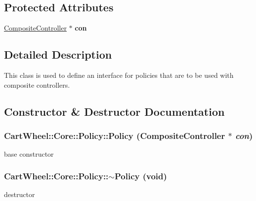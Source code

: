 \subsection*{Protected Attributes}
\begin{DoxyCompactItemize}
\item 
\hypertarget{classCartWheel_1_1Core_1_1Policy_a8515dc70410f0f64885b1fdeeed69c93}{
\hyperlink{classCartWheel_1_1Core_1_1CompositeController}{CompositeController} $\ast$ {\bfseries con}}
\label{classCartWheel_1_1Core_1_1Policy_a8515dc70410f0f64885b1fdeeed69c93}

\end{DoxyCompactItemize}


\subsection{Detailed Description}
This class is used to define an interface for policies that are to be used with composite controllers. 

\subsection{Constructor \& Destructor Documentation}
\hypertarget{classCartWheel_1_1Core_1_1Policy_a107d03cb892f75995a9f0875c04e4be3}{
\subsubsection[{Policy}]{\setlength{\rightskip}{0pt plus 5cm}CartWheel::Core::Policy::Policy ({\bf CompositeController} $\ast$ {\em con})}}
\label{classCartWheel_1_1Core_1_1Policy_a107d03cb892f75995a9f0875c04e4be3}
base constructor \hypertarget{classCartWheel_1_1Core_1_1Policy_a5ce4b4b64a0923faea34a4416b40c40e}{
\subsubsection[{$\sim$Policy}]{\setlength{\rightskip}{0pt plus 5cm}CartWheel::Core::Policy::$\sim$Policy (void)}}
\label{classCartWheel_1_1Core_1_1Policy_a5ce4b4b64a0923faea34a4416b40c40e}
destructor 


